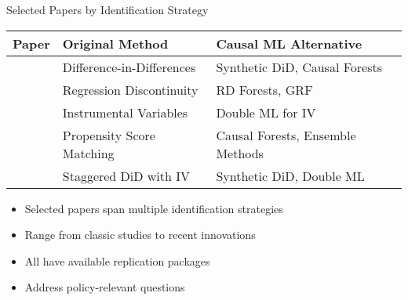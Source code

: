 \documentclass{beamer}
\begin{document}
    \begin{frame}{Selected Papers by Identification Strategy}
        \begin{table}
            \centering
            \tiny
            \begin{tabular}{lll}
                \toprule
                \textbf{Paper} & \textbf{Original Method} & \textbf{Causal ML Alternative} \\
                \midrule
                \textcite{card1994minimum} & Difference-in-Differences & Synthetic DiD, Causal Forests \\
                \addlinespace
                \textcite{angrist2001does} & Regression Discontinuity & RD Forests, GRF \\
                \addlinespace
                \textcite{acemoglu2001colonial} & Instrumental Variables & Double ML for IV \\
                \addlinespace
                \textcite{dehejia1999causal} & Propensity Score Matching & Causal Forests, Ensemble Methods \\
                \addlinespace
                \textcite{autor2020importing} & Staggered DiD with IV & Synthetic DiD, Double ML \\
                \bottomrule
            \end{tabular}
        \end{table}
        
        \vspace{0.3cm}
        \begin{itemize}
            \item Selected papers span multiple identification strategies
            \item Range from classic studies to recent innovations
            \item All have available replication packages
            \item Address policy-relevant questions
        \end{itemize}
    \end{frame}
\end{document}
